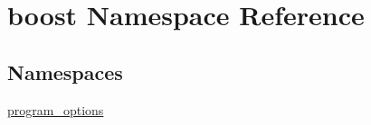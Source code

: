 \hypertarget{namespaceboost}{}\section{boost Namespace Reference}
\label{namespaceboost}
\subsection*{Namespaces}
\begin{DoxyCompactItemize}
\item 
 \hyperlink{namespaceboost_1_1program__options}{program\+\_\+options}
\end{DoxyCompactItemize}

